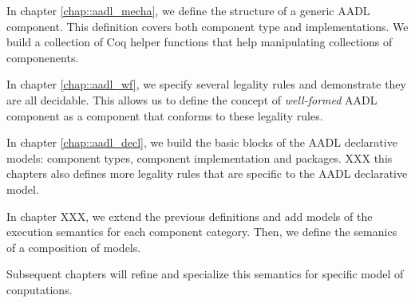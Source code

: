 In chapter \ref{chap::aadl_mecha}, we define the structure of a generic AADL component. This definition covers both component type and implementations. We build a collection of Coq helper functions that help manipulating collections of componenents.

In chapter \ref{chap::aadl_wf}, we specify several legality rules and demonstrate they are all decidable. This allows us to define the concept of \textit{well-formed} AADL component as a component that conforms to these legality rules.

In chapter \ref{chap::aadl_decl}, we build the basic blocks of the AADL declarative models: component types, component implementation and packages. XXX this chapters also defines more legality rules that are specific to the AADL declarative model.

In chapter XXX, we extend the previous definitions and add models of the execution semantics for each component category. Then, we define the semanics of a composition of models.


Subsequent chapters will refine and specialize this semantics for specific model of conputations.


